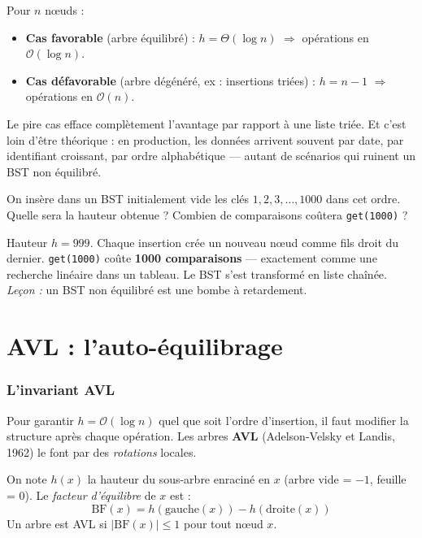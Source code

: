 \documentclass[11pt,a4paper]{article}
\newcommand{\bigO}{\mathcal{O}}
\begin{document}
\begin{attentionbox}
Pour $n$ nœuds :
\begin{itemize}[nosep]
    \item \textbf{Cas favorable} (arbre équilibré) : $h = \Theta(\log n)$ $\Rightarrow$ opérations en $\bigO(\log n)$.
    \item \textbf{Cas défavorable} (arbre dégénéré, ex : insertions triées) : $h = n - 1$ $\Rightarrow$ opérations en $\bigO(n)$.
\end{itemize}
Le pire cas efface complètement l'avantage par rapport à une liste triée. Et c'est loin d'être théorique : en production, les données arrivent souvent par date, par identifiant croissant, par ordre alphabétique --- autant de scénarios qui ruinent un BST non équilibré.
\end{attentionbox}

\begin{appliboxQ}
On insère dans un BST initialement vide les clés $1, 2, 3, \ldots, 1000$ dans cet ordre. Quelle sera la hauteur obtenue ? Combien de comparaisons coûtera \texttt{get(1000)} ?
\end{appliboxQ}

\begin{appliboxR}[Réponse]
Hauteur $h = 999$. Chaque insertion crée un nouveau nœud comme fils droit du dernier. \texttt{get(1000)} coûte \textbf{1000 comparaisons} --- exactement comme une recherche linéaire dans un tableau. Le BST s'est transformé en liste chaînée. \emph{Leçon :} un BST non équilibré est une bombe à retardement.
\end{appliboxR}

\part{AVL : l'auto-équilibrage}

\section{L'invariant AVL}

Pour garantir $h = \bigO(\log n)$ quel que soit l'ordre d'insertion, il faut modifier la structure après chaque opération. Les arbres \textbf{AVL} (Adelson-Velsky et Landis, 1962) le font par des \emph{rotations} locales.

\begin{infobox}
On note $h(x)$ la hauteur du sous-arbre enraciné en $x$ (arbre vide = $-1$, feuille = $0$). Le \emph{facteur d'équilibre} de $x$ est :
\[ \text{BF}(x) = h(\text{gauche}(x)) - h(\text{droite}(x)) \]
Un arbre est AVL si $|\text{BF}(x)| \leq 1$ pour tout nœud $x$.
\end{infobox}
\end{document}
